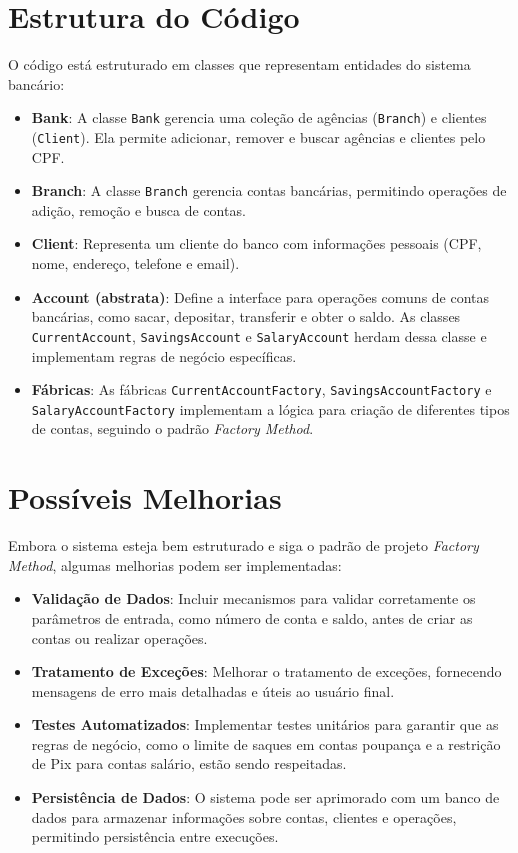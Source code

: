 \documentclass{article}
\begin{document}
\section{Estrutura do Código}
O código está estruturado em classes que representam entidades do sistema bancário:

\begin{itemize}
    \item \textbf{Bank}: A classe \texttt{Bank} gerencia uma coleção de agências (\texttt{Branch}) e clientes (\texttt{Client}). Ela permite adicionar, remover e buscar agências e clientes pelo CPF.
    \item \textbf{Branch}: A classe \texttt{Branch} gerencia contas bancárias, permitindo operações de adição, remoção e busca de contas.
    \item \textbf{Client}: Representa um cliente do banco com informações pessoais (CPF, nome, endereço, telefone e email).
    \item \textbf{Account (abstrata)}: Define a interface para operações comuns de contas bancárias, como sacar, depositar, transferir e obter o saldo. As classes \texttt{CurrentAccount}, \texttt{SavingsAccount} e \texttt{SalaryAccount} herdam dessa classe e implementam regras de negócio específicas.
    \item \textbf{Fábricas}: As fábricas \texttt{CurrentAccountFactory}, \texttt{SavingsAccountFactory} e \texttt{SalaryAccountFactory} implementam a lógica para criação de diferentes tipos de contas, seguindo o padrão \textit{Factory Method}.
\end{itemize}

\section{Possíveis Melhorias}
Embora o sistema esteja bem estruturado e siga o padrão de projeto \textit{Factory Method}, algumas melhorias podem ser implementadas:
\begin{itemize}
    \item \textbf{Validação de Dados}: Incluir mecanismos para validar corretamente os parâmetros de entrada, como número de conta e saldo, antes de criar as contas ou realizar operações.
    \item \textbf{Tratamento de Exceções}: Melhorar o tratamento de exceções, fornecendo mensagens de erro mais detalhadas e úteis ao usuário final.
    \item \textbf{Testes Automatizados}: Implementar testes unitários para garantir que as regras de negócio, como o limite de saques em contas poupança e a restrição de Pix para contas salário, estão sendo respeitadas.
    \item \textbf{Persistência de Dados}: O sistema pode ser aprimorado com um banco de dados para armazenar informações sobre contas, clientes e operações, permitindo persistência entre execuções.
\end{itemize}
\end{document}

